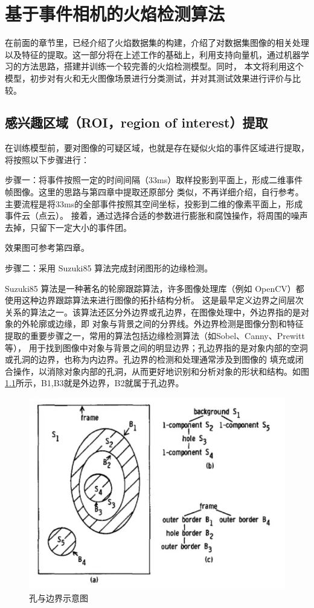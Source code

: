 
\chapter{基于事件相机的火焰检测算法}
在前面的章节里，已经介绍了火焰数据集的构建，介绍了对数据集图像的相关处理以及特征的提取。这一部分将在上述工作的基础上，利用支持向量机，通过机器学习的方法思路，搭建并训练一个较完善的火焰检测模型。同时，
本文将利用这个模型，初步对有火和无火图像场景进行分类测试，并对其测试效果进行评价与比较。

\section{感兴趣区域（ROI，region of interest）提取}
在训练模型前，要对图像的可疑区域，也就是存在疑似火焰的事件区域进行提取，将按照以下步骤进行：

步骤一：将事件按照一定的时间间隔（33ms）取样投影到平面上，形成二维事件帧图像。这里的思路与第四章中提取还原部分
类似，不再详细介绍，自行参考。主要流程是将33ms的全部事件按照其空间坐标，投影到二维的像素平面上，形成事件云（点云）。
接着，通过选择合适的参数进行膨胀和腐蚀操作，将周围的噪声去掉，只留下一定大小的事件团。

效果图可参考第四章。

步骤二：采用 Suzuki85 算法完成封闭图形的边缘检测。

Suzuki85 算法是一种著名的轮廓跟踪算法\cite{suzuki1985topological}，许多图像处理库（例如 OpenCV）都使用这种边界跟踪算法来进行图像的拓扑结构分析。
这是最早定义边界之间层次关系的算法之一。该算法还区分外边界或孔边界，在图像处理中，外边界指的是对象的外轮廓或边缘，即
对象与背景之间的分界线。外边界检测是图像分割和特征提取的重要步骤之一，常用的算法包括边缘检测算法（如Sobel、Canny、Prewitt等），
用于找到图像中对象与背景之间的明显边界；孔边界指的是对象内部的空洞或孔洞的边界，也称为内边界。孔边界的检测和处理通常涉及到图像的
填充或闭合操作，以消除对象内部的孔洞，从而更好地识别和分析对象的形状和结构。如图\ref{17}所示，B1,B3就是外边界，B2就属于孔边界。
\begin{figure}[ht]
    \centering
    \includegraphics[width=\textwidth]{figures/algorithm_boundary.png}
    \caption{孔与边界示意图}
    \label{17}
\end{figure}

